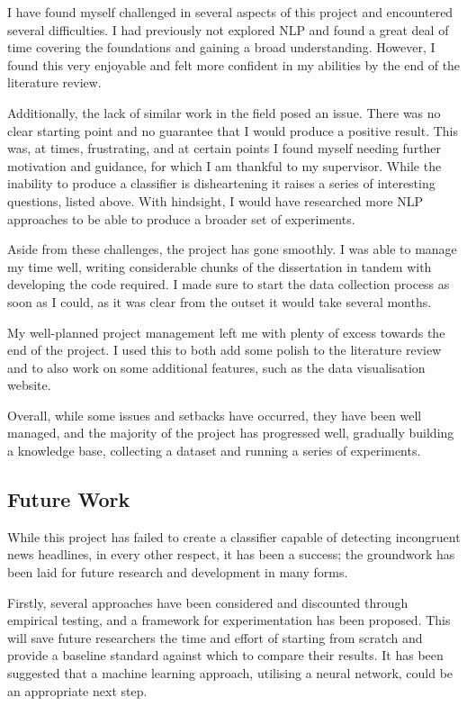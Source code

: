 I have found myself challenged in several aspects of this project and encountered several difficulties. I had previously not explored NLP and found a great deal of time covering the foundations and gaining a broad understanding. However, I found this very enjoyable and felt more confident in my abilities by the end of the literature review.

Additionally, the lack of similar work in the field posed an issue. There was no clear starting point and no guarantee that I would produce a positive result. This was, at times, frustrating, and at certain points I found myself needing further motivation and guidance, for which I am thankful to my supervisor.  While the inability to produce a classifier is disheartening it raises a series of interesting questions, listed above. With hindsight, I would have researched more NLP approaches to be able to produce a broader set of experiments.

Aside from these challenges, the project has gone smoothly. I was able to manage my time well, writing considerable chunks of the dissertation in tandem with developing the code required. I made sure to start the data collection process as soon as I could, as it was clear from the outset it would take several months. 

My well-planned project management left me with plenty of excess towards the end of the project. I used this to both add some polish to the literature review and to also work on some additional features, such as the data visualisation website.

Overall, while some issues and setbacks have occurred, they have been well managed, and the majority of the project has progressed well, gradually building a knowledge base, collecting a dataset and running a series of experiments.


\subsection{Future Work}

While this project has failed to create a classifier capable of detecting incongruent news headlines, in every other respect, it has been a success; the groundwork has been laid for future research and development in many forms. 

Firstly, several approaches have been considered and discounted through empirical testing, and a framework for experimentation has been proposed. This will save future researchers the time and effort of starting from scratch and provide a baseline standard against which to compare their results. It has been suggested that a machine learning approach, utilising a neural network, could be an appropriate next step.

